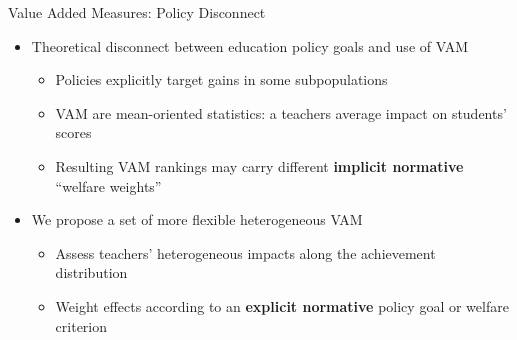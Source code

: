\documentclass[t,aspectratio=169,11pt]{beamer}
\begin{document}
\begin{frame}{Value Added Measures: Policy Disconnect }
\begin{itemize}


    \item Theoretical disconnect between education policy goals and use of VAM 
    \begin{itemize}
        \item Policies explicitly target gains in some subpopulations
        \item VAM are mean-oriented statistics: a teachers average impact on students' scores
        \item Resulting VAM rankings may carry different \textbf{implicit normative} ``welfare weights''
    \end{itemize}
    
    \item  We propose a set of more flexible heterogeneous VAM 
    \begin{itemize}
        \item Assess teachers' heterogeneous impacts along the achievement distribution
        \item  Weight effects according to an \textbf{explicit normative} policy goal or welfare criterion
    \end{itemize}
\end{itemize}


\end{frame}

\end{document}
